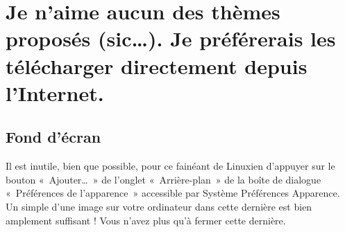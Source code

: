 \section{Je n'aime aucun des thèmes proposés (sic\ldots{}). Je préférerais les télécharger directement depuis l'Internet.}
\subsection{Fond d'écran}
Il est inutile, bien que possible, pour ce fainéant de Linuxien d'appuyer sur le bouton «~Ajouter\ldots{}~» de l'onglet «~Arrière-plan~» de la boîte de dialogue «~Préférences de l'apparence~» accessible par Système \FlecheDroite Préférences \FlecheDroite Apparence. Un simple  d'une image sur votre ordinateur dans cette dernière est bien amplement suffisant ! Vous n'avez plus qu'à fermer cette dernière.
